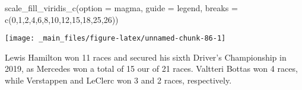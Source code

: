 \documentclass[
]{book}
\newenvironment{Shaded}{\begin{snugshade}}{\end{snugshade}}
\newcommand{\AttributeTok}[1]{\textcolor[rgb]{0.77,0.63,0.00}{#1}}
\newcommand{\DecValTok}[1]{\textcolor[rgb]{0.00,0.00,0.81}{#1}}
\newcommand{\FunctionTok}[1]{\textcolor[rgb]{0.00,0.00,0.00}{#1}}
\newcommand{\NormalTok}[1]{#1}
\newcommand{\StringTok}[1]{\textcolor[rgb]{0.31,0.60,0.02}{#1}}
\begin{document}
\begin{Shaded}
\begin{Highlighting}[]
  \FunctionTok{scale\_fill\_viridis\_c}\NormalTok{(}\AttributeTok{option =} \StringTok{\textquotesingle{}magma\textquotesingle{}}\NormalTok{,}
                       \AttributeTok{guide =} \StringTok{\textquotesingle{}legend\textquotesingle{}}\NormalTok{,}
                       \AttributeTok{breaks =} \FunctionTok{c}\NormalTok{(}\DecValTok{0}\NormalTok{,}\DecValTok{1}\NormalTok{,}\DecValTok{2}\NormalTok{,}\DecValTok{4}\NormalTok{,}\DecValTok{6}\NormalTok{,}\DecValTok{8}\NormalTok{,}\DecValTok{10}\NormalTok{,}\DecValTok{12}\NormalTok{,}\DecValTok{15}\NormalTok{,}\DecValTok{18}\NormalTok{,}\DecValTok{25}\NormalTok{,}\DecValTok{26}\NormalTok{))}
\end{Highlighting}
\end{Shaded}

\begin{center}\texttt{[image: \_main\_files/figure-latex/unnamed-chunk-86-1]} \end{center}

Lewis Hamilton won 11 races and secured his sixth Driver's Championship in 2019, as Mercedes won a total of 15 our of 21 races. Valtteri Bottas won 4 races, while Verstappen and LeClerc won 3 and 2 races, respectively.
\end{document}
